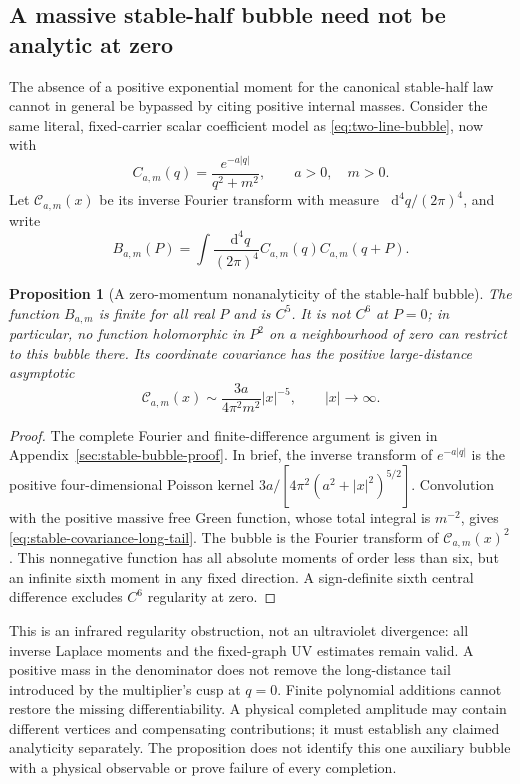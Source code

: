 \documentclass[final,5p,times,twocolumn,numbers,nopreprintline]{elsarticle}
\numberwithin{equation}{section}
\newtheorem{proposition}[theorem]{Proposition}
\theoremstyle{definition}
\theoremstyle{remark}
\newcommand{\dd}{\mathop{}\!\mathrm d}
\begin{document}
\subsection{A massive stable-half bubble need not be analytic at zero}
\label{sec:stable-bubble-origin}

The absence of a positive exponential moment for the canonical
stable-half law cannot in general be bypassed by citing positive
internal masses. Consider the same literal, fixed-carrier scalar
coefficient model as \eqref{eq:two-line-bubble}, now with
\[
 C_{a,m}(q)=\frac{e^{-a|q|}}{q^2+m^2},\qquad a>0,\quad m>0.
\]
Let \(\mathcal C_{a,m}(x)\) be its inverse Fourier transform
with measure \(\dd^4q/(2\pi)^4\), and write
\[
 B_{a,m}(P)=\int\frac{\dd^4q}{(2\pi)^4}
                   C_{a,m}(q)C_{a,m}(q+P).
\]

\begin{proposition}[A zero-momentum nonanalyticity of the stable-half bubble]
\label{prop:stable-bubble-nonanalytic}
The function \(B_{a,m}\) is finite for all real \(P\) and is
\(C^5\). It is not \(C^6\) at \(P=0\); in particular, no
function holomorphic in \(P^2\) on a neighbourhood of zero can
restrict to this bubble there. Its coordinate covariance has the
positive large-distance asymptotic
\begin{equation}
 \mathcal C_{a,m}(x)\sim
        \frac{3a}{4\pi^2m^2}|x|^{-5},\qquad |x|\to\infty.
 \label{eq:stable-covariance-long-tail}
\end{equation}
\end{proposition}

\begin{proof}
The complete Fourier and finite-difference argument is given in
Appendix~\ref{sec:stable-bubble-proof}. In brief, the inverse
transform of \(e^{-a|q|}\) is the positive four-dimensional
Poisson kernel
\(3a/[4\pi^2(a^2+|x|^2)^{5/2}]\). Convolution with the
positive massive free Green function, whose total integral is
\(m^{-2}\), gives \eqref{eq:stable-covariance-long-tail}.
The bubble is the Fourier transform of
\(\mathcal C_{a,m}(x)^2\). This nonnegative function has all
absolute moments of order less than six, but an infinite sixth
moment in any fixed direction. A sign-definite sixth central
difference excludes \(C^6\) regularity at zero.
\end{proof}

This is an infrared regularity obstruction, not an ultraviolet
divergence: all inverse Laplace moments and the fixed-graph UV
estimates remain valid. A positive mass in the denominator does
not remove the long-distance tail introduced by the multiplier's
cusp at \(q=0\). Finite polynomial additions cannot restore the
missing differentiability. A physical completed amplitude may
contain different vertices and compensating contributions; it
must establish any claimed analyticity separately. The proposition
does not identify this one auxiliary bubble with a physical
observable or prove failure of every completion.
\end{document}
